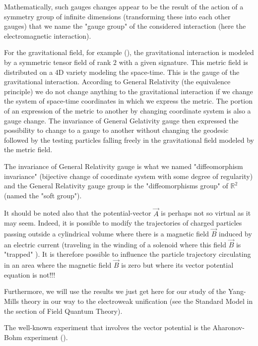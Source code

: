 	Mathematically, such gauges changes appear to be the result of the action of a symmetry group of infinite dimensions (transforming these into each other gauges) that we name the "gauge group" of the considered interaction  (here the electromagnetic interaction).

	For the gravitational field, for example (), the gravitational interaction is modeled by a symmetric tensor field of rank $2$ with a given signature. This metric field is distributed on a 4D variety  modeling the space-time. This is the gauge of the gravitational interaction. According to General Relativity (the equivalence principle) we do not change anything to the gravitational interaction if we change the system of space-time coordinates in which we express the metric. The portion of an expression of the metric to another by changing coordinate system is also a gauge change. The invariance of General Gelativity gauge then expressed the possibility to change to a gauge to another without changing the geodesic followed by the testing particles falling freely in the gravitational field modeled by the metric field.

	The invariance of General Relativity gauge is what we named "diffeomorphism invariance" (bijective change of coordinate system with some degree of regularity) and the General Relativity gauge group is the "diffeomorphisms group" of $\mathbb{R}^2$ (named the "soft group").

	It should be noted also that the potential-vector $\vec{A}$ is perhaps not so virtual as it may seem. Indeed, it is possible to modify the trajectories of charged particles passing outside a cylindrical volume where there is a magnetic field $\vec{B}$ induced by an electric current (traveling in the winding of a solenoid where this field $\vec{B}$ is "trapped" ). It is therefore possible to influence the particle trajectory circulating in an area where the magnetic field $\vec{B}$ is zero but where its vector potential equation is not!!!

	Furthermore, we will use the results we just get here for our study of the Yang-Mills theory in our way to the electroweak unification (see the Standard Model in the section of Field Quantum Theory). 
	\begin{tcolorbox}[title=Remark,colframe=black,arc=10pt]
	The well-known experiment that involves the vector potential is the Aharonov-Bohm experiment ().
	\end{tcolorbox}
	
